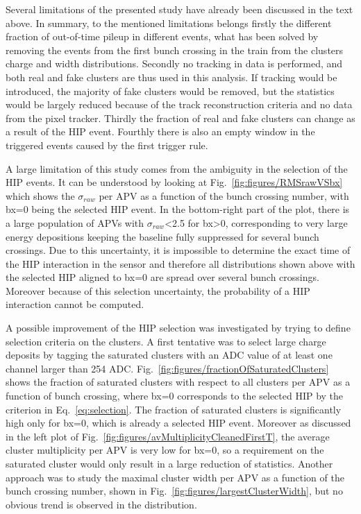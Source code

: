 Several limitations of the presented study have already been discussed in the text above. In summary, to the mentioned limitations belongs firstly the different fraction of out-of-time pileup in different events, what has been solved by removing the events from the first bunch crossing in the train from the clusters charge and width distributions. Secondly no tracking in data is performed, and both real and fake clusters are thus used in this analysis. If tracking would be introduced, the majority of fake clusters would be removed, but the statistics would be largely reduced because of the track reconstruction criteria and no data from the pixel tracker. Thirdly the fraction of real and fake clusters can change as a result of the HIP event. Fourthly there is also an empty window in the triggered events caused by the first trigger rule.


A large limitation of this study comes from the ambiguity in the selection of the HIP events. It can be understood by looking at Fig.~\ref{fig:figures/RMSrawVSbx} which shows the $\sigma_{raw}$ per APV as a function of the bunch crossing number, with bx=0 being the selected HIP event. In the bottom-right part of the plot, there is a large population of APVs with $\sigma_{raw}$<2.5 for bx>0, corresponding to very large energy depositions keeping the baseline fully suppressed for several bunch crossings. Due to this uncertainty, it is impossible to determine the exact time of the HIP interaction in the sensor and therefore all distributions shown above with the selected HIP aligned to bx=0 are spread over several bunch crossings. Moreover because of this selection uncertainty, the probability of a HIP interaction cannot be computed. 


A possible improvement of the HIP selection was investigated by trying to define selection criteria on the clusters. A first tentative was to select large charge deposits by tagging the saturated clusters with an ADC value of at least one channel larger than 254 ADC. Fig.~\ref{fig:figures/fractionOfSaturatedClusters} shows the fraction of saturated clusters with respect to all clusters per APV as a function of bunch crossing, where bx=0 corresponds to the selected HIP by the criterion in Eq.~\ref{eq:selection}. The fraction of saturated clusters is significantly high only for bx=0, which is already a selected HIP event. Moreover as discussed in the left plot of Fig.~\ref{fig:figures/avMultiplicityCleanedFirstT}, the average cluster multiplicity per APV is very low for bx=0, so a requirement on the saturated cluster would only result in a large reduction of statistics. Another approach was to study the maximal cluster width per APV as a function of the bunch crossing number, shown in Fig.~\ref{fig:figures/largestClusterWidth}, but no obvious trend is observed in the distribution. 

